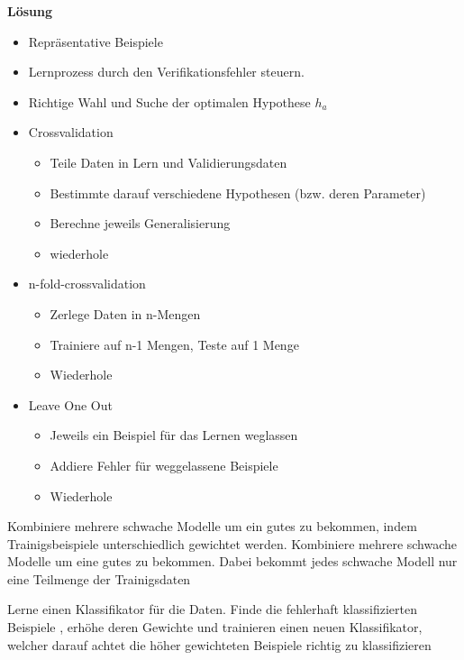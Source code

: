 \textbf{Lösung}
\begin{itemize}
    \item Repräsentative Beispiele
    \item Lernprozess durch den Verifikationsfehler steuern.
    \item Richtige Wahl und Suche der optimalen Hypothese $h_a$
\end{itemize}


\begin{itemize}
    \item Crossvalidation
    \begin{itemize}
        \item Teile Daten in Lern und Validierungsdaten
        \item Bestimmte darauf verschiedene Hypothesen (bzw. deren Parameter)
        \item Berechne jeweils Generalisierung
        \item wiederhole
    \end{itemize}
    \item n-fold-crossvalidation
    \begin{itemize}
        \item Zerlege Daten in n-Mengen
        \item Trainiere auf n-1 Mengen, Teste auf 1 Menge
        \item Wiederhole
    \end{itemize}
    \item Leave One Out
    \begin{itemize}
        \item Jeweils ein Beispiel für das Lernen weglassen
        \item Addiere Fehler für weggelassene Beispiele
        \item Wiederhole
    \end{itemize}
\end{itemize}

Kombiniere mehrere schwache Modelle um ein gutes zu bekommen, indem Trainigsbeispiele unterschiedlich
gewichtet werden.
Kombiniere mehrere schwache Modelle um eine gutes zu bekommen. Dabei bekommt jedes
schwache Modell nur eine Teilmenge der Trainigsdaten

Lerne einen Klassifikator für die Daten. Finde die fehlerhaft klassifizierten Beispiele
, erhöhe deren Gewichte und trainieren einen neuen Klassifikator, welcher darauf achtet
die höher gewichteten Beispiele richtig zu klassifizieren

